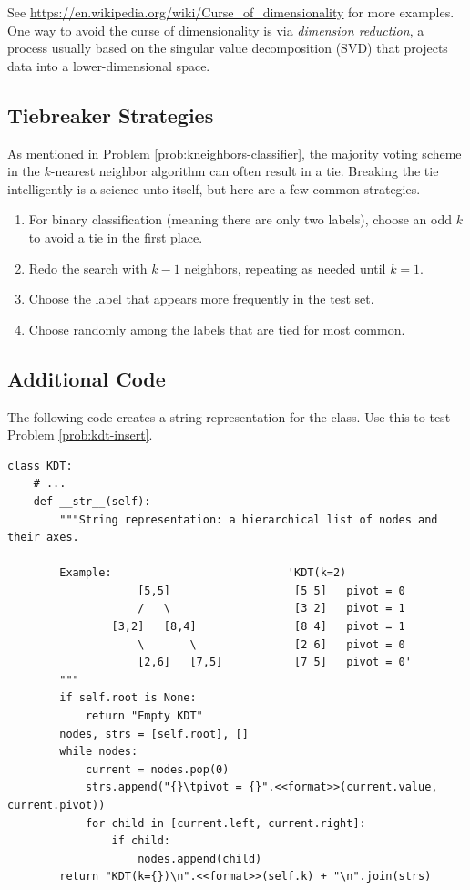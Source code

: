 See \url{https://en.wikipedia.org/wiki/Curse_of_dimensionality} for more examples.
One way to avoid the curse of dimensionality is via \emph{dimension reduction}, a process usually based on the singular value decomposition (SVD) that projects data into a lower-dimensional space.

\subsection*{Tiebreaker Strategies} %

As mentioned in Problem \ref{prob:kneighbors-classifier}, the majority voting scheme in the $k$-nearest neighbor algorithm can often result in a tie.
Breaking the tie intelligently is a science unto itself, but here are a few common strategies.
\begin{enumerate}
\item For binary classification (meaning there are only two labels), choose an odd $k$ to avoid a tie in the first place.
\item Redo the search with $k-1$ neighbors, repeating as needed until $k=1$.
\item Choose the label that appears more frequently in the test set.
\item Choose randomly among the labels that are tied for most common.
\end{enumerate}

\subsection*{Additional Code} %

The following code creates a string representation for the  class.
Use this to test Problem \ref{prob:kdt-insert}.

\begin{lstlisting}
class KDT:
    # ...
    def __str__(self):
        """String representation: a hierarchical list of nodes and their axes.

        Example:                           'KDT(k=2)
                    [5,5]                   [5 5]   pivot = 0
                    /   \                   [3 2]   pivot = 1
                [3,2]   [8,4]               [8 4]   pivot = 1
                    \       \               [2 6]   pivot = 0
                    [2,6]   [7,5]           [7 5]   pivot = 0'
        """
        if self.root is None:
            return "Empty KDT"
        nodes, strs = [self.root], []
        while nodes:
            current = nodes.pop(0)
            strs.append("{}\tpivot = {}".<<format>>(current.value, current.pivot))
            for child in [current.left, current.right]:
                if child:
                    nodes.append(child)
        return "KDT(k={})\n".<<format>>(self.k) + "\n".join(strs)
\end{lstlisting}
